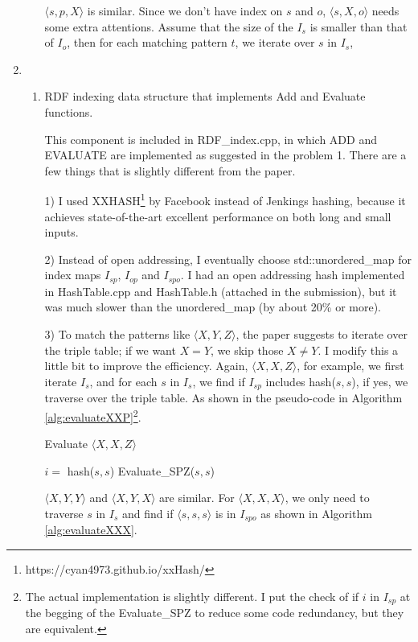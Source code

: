 \documentclass{article}
\begin{document}
\begin{enumerate}
\begin{enumerate}
$\langle s, p, X\rangle$ is similar. Since we don't have index on $s$ and $o$,  $\langle s, X, o\rangle$ needs some extra attentions. Assume that the size of the $I_s$ is smaller than that of $I_o$, then for each matching pattern $t$, we iterate over $s$ in $I_s$, 

\end{enumerate}
\item 
\begin{enumerate}
\item RDF indexing data structure that implements Add and Evaluate functions.

This component is included in RDF\_index.cpp, in which ADD and EVALUATE are implemented as suggested in the problem 1. There are a few things that is slightly different from the paper. 

1) I used XXHASH\footnote{https://cyan4973.github.io/xxHash/} by Facebook instead of Jenkings hashing, because it achieves state-of-the-art excellent performance on both long and small inputs. 

2) Instead of open addressing, I eventually choose std::unordered\_map for index maps $I_{sp}$, $I_{op}$ and $I_{spo}$. I had an open addressing hash implemented in HashTable.cpp and HashTable.h (attached in the submission), but it was much slower than the unordered\_map (by about 20\% or more).

3) To match the patterns like $\langle X, Y, Z\rangle$, the paper suggests to iterate over the triple table; if we want $X = Y$,  we skip those $X\neq Y$. I modify this a little bit to improve the efficiency. Again, $\langle X, X, Z\rangle$, for example, we first iterate $I_s$, and for each $s$ in $I_s$, we find if $I_{sp}$ includes hash($s, s$), if yes, we traverse over the triple table. As shown in the pseudo-code in Algorithm \eqref{alg:evaluateXXP}\footnote{The actual implementation is slightly different. I put the check of if $i$ in $I_{sp}$ at the begging of the Evaluate\_SPZ to reduce some code redundancy, but they are equivalent.}.

\begin{algorithm}[H]
\caption{Evaluate $\langle X, X, Z\rangle$}\label{alg:evaluateXXP}
\begin{algorithmic}
\State $i = $ hash($s, s$)
\State Evaluate\_SPZ($s, s$)
\EndIf
\EndFor
\end{algorithmic}
\end{algorithm}

$\langle X, Y, Y\rangle$ and $\langle X, Y, X\rangle$ are similar. For $\langle X, X, X\rangle$, we only need to traverse  $s$ in $I_s$ and find if $\langle s, s, s\rangle$ is in $I_{spo}$ as shown in  Algorithm \eqref{alg:evaluateXXX}.


\end{enumerate}
\end{enumerate}
\end{document}
